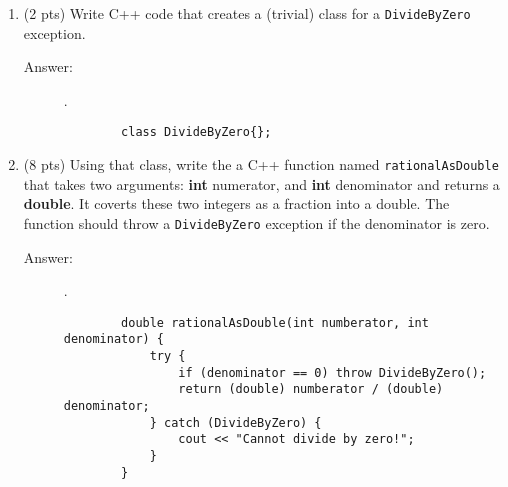 \documentclass[11pt]{article}
\begin{document}
\begin{enumerate}
\item (2 pts) Write C++ code that creates a (trivial) class for a
\texttt{DivideByZero} exception.

\begin{description}
    \item[Answer:] .\\
    \begin{verbatim}
        class DivideByZero{};
    \end{verbatim}
\end{description}

\item (8 pts) Using that class, write the a C++ function named \texttt{rationalAsDouble}
that takes two arguments: \textbf{int} numerator, and \textbf{int} denominator and returns
a \textbf{double}. It coverts these two integers as a fraction into a double. The
function should throw a \texttt{DivideByZero} exception if the denominator is zero.

\begin{description}
    \item[Answer:] .\\
    \begin{verbatim}
        double rationalAsDouble(int numberator, int denominator) {
            try {
                if (denominator == 0) throw DivideByZero();
                return (double) numberator / (double) denominator;
            } catch (DivideByZero) {
                cout << "Cannot divide by zero!";
            }
        }
    \end{verbatim}
\end{description}
\end{enumerate}
\end{document}
